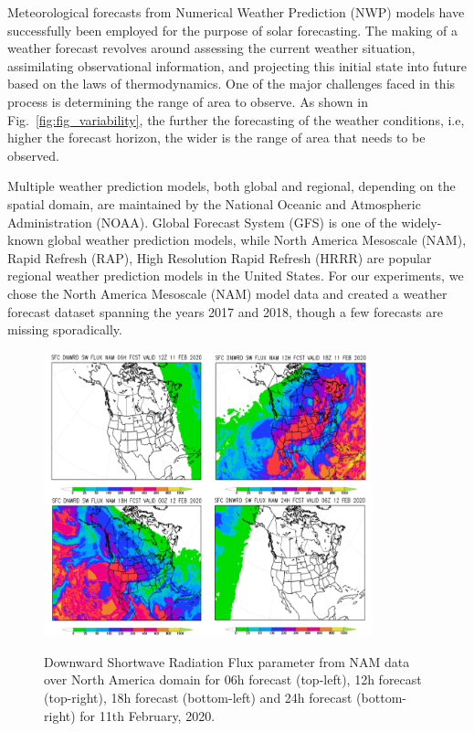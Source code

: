 Meteorological forecasts from Numerical Weather Prediction (NWP) models have successfully been employed for the purpose of solar forecasting. The making of a weather forecast revolves around assessing the current weather situation, assimilating observational information, and projecting this initial state into future based on the laws of thermodynamics. One of the major challenges faced in this process is determining the range of area to observe. As shown in Fig.~\ref{fig:fig_variability}, the further the forecasting of the weather conditions, i.e, higher the forecast horizon, the wider is the range of area that needs to be observed. 

\par Multiple weather prediction models, both global and regional, depending on the spatial domain, are maintained by the National Oceanic and Atmospheric Administration (NOAA). Global Forecast System (GFS) is one of the widely-known global weather prediction models, while North America Mesoscale (NAM), Rapid Refresh (RAP), High Resolution Rapid Refresh (HRRR) are popular regional weather prediction models in the United States. For our experiments, we chose the North America Mesoscale (NAM) model data and created a weather forecast dataset spanning the years 2017 and 2018, though a few forecasts are missing sporadically.

\begin{figure}[htbp]
    \begin{center}
    	\includegraphics[width=0.85\textwidth]{chapter3/fig_nam_dswrf.png}
    	\label{fig:fig_nam_dswrf}
    	\caption[Downward shortwave radiation flux parameter for 06h, 12h, 18h, 24h forecasts in a day for NAM model data]{Downward Shortwave Radiation Flux parameter from NAM data over North America domain for 06h forecast (top-left), 12h forecast (top-right), 18h forecast (bottom-left) and 24h forecast (bottom-right) for 11th February, 2020.}
    \end{center}
\end{figure}

